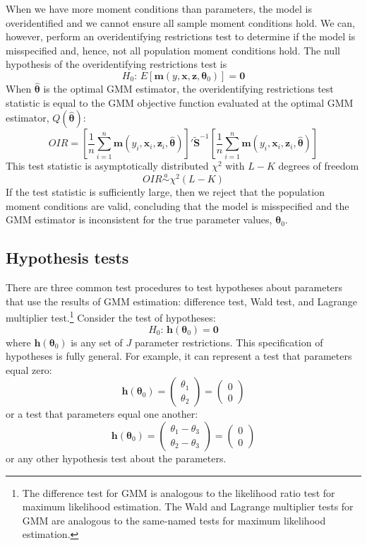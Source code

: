 \documentclass[11pt,letterpaper]{article}
\begin{document}
When we have more moment conditions than parameters, the model is overidentified and we cannot ensure all sample moment conditions hold. We can, however, perform an overidentifying restrictions test to determine if the model is misspecified and, hence, not all population moment conditions hold. The null hypothesis of the overidentifying restrictions test is
$$H_0 \text{: } E[\bm{m}(y, \bm{x}, \bm{z}, \bm{\theta}_0)] = \bm{0}$$
When $\widehat{\bm{\theta}}$ is the optimal GMM estimator, the overidentifying restrictions test statistic is equal to the GMM objective function evaluated at the optimal GMM estimator, $Q(\widehat{\bm{\theta}})$:
$$OIR = \left[ \frac{1}{n} \sum_{i = 1}^n \bm{m}(y_i, \bm{x}_i, \bm{z}_i, \widehat{\bm{\theta}}) \right]' \widetilde{\bm{S}}^{-1} \left[ \frac{1}{n} \sum_{i = 1}^n \bm{m}(y_i, \bm{x}_i, \bm{z}_i, \widehat{\bm{\theta}}) \right]$$
This test statistic is asymptotically distributed $\chi^2$ with $L - K$ degrees of freedom
$$OIR \overset{a}{\sim} \chi^2(L - K)$$
If the test statistic is sufficiently large, then we reject that the population moment conditions are valid, concluding that the model is misspecified and the GMM estimator is inconsistent for the true parameter values, $\bm{\theta}_0$.

\subsection{Hypothesis tests}

There are three common test procedures to test hypotheses about parameters that use the results of GMM estimation: difference test, Wald test, and Lagrange multiplier test.\footnote{The difference test for GMM is analogous to the likelihood ratio test for maximum likelihood estimation. The Wald and Lagrange multiplier tests for GMM are analogous to the same-named tests for maximum likelihood estimation.} Consider the test of hypotheses:
$$H_0 \text{: } \bm{h}(\bm{\theta}_0) = \bm{0}$$
where $\bm{h}(\bm{\theta}_0)$ is any set of $J$ parameter restrictions. This specification of hypotheses is fully general. For example, it can represent a test that parameters equal zero:
$$\bm{h}(\bm{\theta}_0) = \begin{pmatrix}
  \theta_1 \\
  \theta_2
\end{pmatrix} = \begin{pmatrix}
  0 \\
  0
\end{pmatrix}$$
or a test that parameters equal one another:
$$\bm{h}(\bm{\theta}_0) = \begin{pmatrix}
  \theta_1 - \theta_3 \\
  \theta_2 - \theta_3
\end{pmatrix} = \begin{pmatrix}
  0 \\
  0
\end{pmatrix}$$
or any other hypothesis test about the parameters. \\
\end{document}
